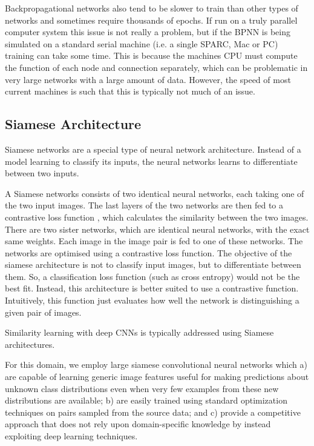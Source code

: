 Backpropagational networks also tend to be slower to train than other types of networks and sometimes require thousands of epochs. If run on a truly parallel computer system this issue is not really a problem, but if the BPNN is being simulated on a standard serial machine (i.e. a single SPARC, Mac or PC) training can take some time. This is because the machines CPU must compute the function of each node and connection separately, which can be problematic in very large networks with a large amount of data. However, the speed of most current machines is such that this is typically not much of an issue.

\subsection{Siamese Architecture}
Siamese networks are a special type of neural network architecture. Instead of a model learning to classify its inputs, the neural networks learns to differentiate between two inputs. 

A Siamese networks consists of two identical neural networks, each taking one of the two input images. The last layers of the two networks are then fed to a contrastive loss function , which calculates the similarity between the two images. There are two sister networks, which are identical neural networks, with the exact same weights. Each image in the image pair is fed to one of these networks. The networks are optimised using a contrastive loss function. The objective of the siamese architecture is not to classify input images, but to differentiate between them. So, a classification loss function (such as cross entropy) would not be the best fit. Instead, this architecture is better suited to use a contrastive function. Intuitively, this function just evaluates how well the network is distinguishing a given pair of images.

Similarity learning with deep CNNs is typically addressed using Siamese architectures.

For this domain, we
employ large siamese convolutional neural networks which a) are capable of learning generic image features useful for making predictions about unknown class distributions
even when very few examples from these new distributions are available; b) are easily trained using standard optimization techniques on pairs sampled from the source
data; and c) provide a competitive approach that does not rely upon domain-specific knowledge by instead exploiting deep learning techniques.

